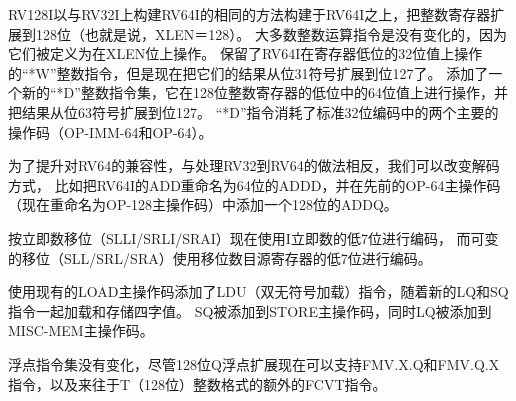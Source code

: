 RV128I以与RV32I上构建RV64I的相同的方法构建于RV64I之上，把整数寄存器扩展到128位（也就是说，XLEN＝128）。
大多数整数运算指令是没有变化的，因为它们被定义为在XLEN位上操作。
保留了RV64I在寄存器低位的32位值上操作的“*W”整数指令，但是现在把它们的结果从位31符号扩展到位127了。
添加了一个新的“*D”整数指令集，它在128位整数寄存器的低位中的64位值上进行操作，并把结果从位63符号扩展到位127。
“*D”指令消耗了标准32位编码中的两个主要的操作码（OP-IMM-64和OP-64）。

\begin{commentary}
  为了提升对RV64的兼容性，与处理RV32到RV64的做法相反，我们可以改变解码方式，
  比如把RV64I的ADD重命名为64位的ADDD，并在先前的OP-64主操作码（现在重命名为OP-128主操作码）中添加一个128位的ADDQ。
\end{commentary}

按立即数移位（SLLI/SRLI/SRAI）现在使用I立即数的低7位进行编码，
而可变的移位（SLL/SRL/SRA）使用移位数目源寄存器的低7位进行编码。

使用现有的LOAD主操作码添加了LDU（双无符号加载）指令，随着新的LQ和SQ指令一起加载和存储四字值。
SQ被添加到STORE主操作码，同时LQ被添加到MISC-MEM主操作码。

浮点指令集没有变化，尽管128位Q浮点扩展现在可以支持FMV.X.Q和FMV.Q.X指令，以及来往于T（128位）整数格式的额外的FCVT指令。


